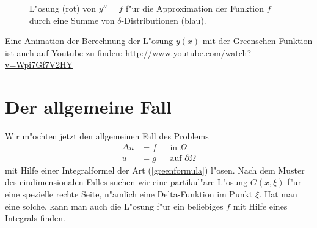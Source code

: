 \begin{beispiel}
\begin{figure}
\begin{center}
\end{center}
\caption{L"osung (rot) von $y''=f$ f"ur die Approximation der Funktion $f$
durch eine Summe von $\delta$-Distributionen (blau).
\label{elliptisch:green-beispiele}}
\end{figure}

Eine Animation der Berechnung der L"osung $y(x)$ mit der Greenschen
Funktion ist auch auf Youtube zu finden: \url{http://www.youtube.com/watch?v=Wpi7Gf7V2HY}
\end{beispiel}

\section{Der allgemeine Fall}
Wir m"ochten jetzt den allgemeinen Fall des Problems
\begin{align*}
\Delta u&=f&&\text{in $\Omega$}\\
u&=g&&\text{auf $\partial\Omega$}
\end{align*}
mit Hilfe einer Integralformel der Art (\ref{greenformula}) 
l"osen. Nach dem Muster des eindimensionalen Falles suchen
wir eine partikul"are L"osung $G(x,\xi)$ f"ur eine spezielle rechte Seite,
n"amlich eine Delta-Funktion im Punkt $\xi$.  Hat man eine
solche, kann man auch die L"osung f"ur ein beliebiges $f$ mit
Hilfe eines Integrals finden.


